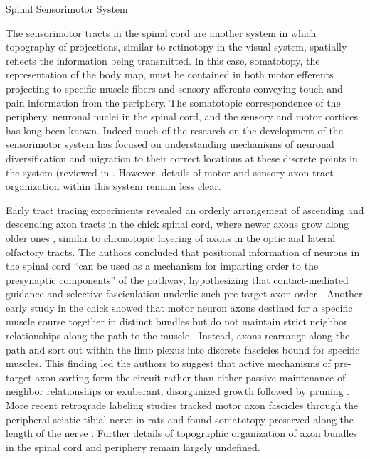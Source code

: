 Spinal Sensorimotor System

The sensorimotor tracts in the spinal cord are another system in which topography of projections, similar to retinotopy in the visual system, spatially reflects the information being transmitted.
In this case, somatotopy, the representation of the body map, must be contained in both motor efferents projecting to specific muscle fibers and sensory afferents conveying touch and pain information from the periphery.
The somatotopic correspondence of the periphery, neuronal nuclei in the spinal cord, and the sensory and motor cortices has long been known.
Indeed much of the research on the development of the sensorimotor system has focused on understanding mechanisms of neuronal diversification and migration to their correct locations at these discrete points in the system (reviewed in \cite{kania2014spinal}.
However, details of motor and sensory axon tract organization within this system remain less clear.

Early tract tracing experiments revealed an orderly arrangement of ascending and descending axon tracts in the chick spinal cord, where newer axons grow along older ones \cite{nornes1980pattern}, similar to chronotopic layering of axons in the optic and lateral olfactory tracts. 
The authors concluded that positional information of neurons in the spinal cord “can be used as a mechanism for imparting order to the presynaptic components” of the pathway, hypothesizing that contact-mediated guidance and selective fasciculation underlie such pre-target axon order \cite{nornes1980pattern}. 
Another early study in the chick showed that motor neuron axons destined for a specific muscle course together in distinct bundles but do not maintain strict neighbor relationships along the path to the muscle \cite{lance1981pathway}. 
Instead, axons rearrange along the path and sort out within the limb plexus into discrete fascicles bound for specific muscles. 
This finding led the authors to suggest that active mechanisms of pre-target axon sorting form the circuit rather than either passive maintenance of neighbor relationships or exuberant, disorganized growth followed by pruning \cite{lance1981pathway}. 
More recent retrograde labeling studies tracked motor axon fascicles through the peripheral sciatic-tibial nerve in rats and found somatotopy preserved along the length of the nerve \cite{badia2010topographical}. 
Further details of topographic organization of axon bundles in the spinal cord and periphery remain largely undefined.

